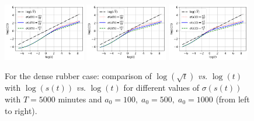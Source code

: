 \documentclass{article}
\begin{document}
\begin{figure}[h!]
	\centering
	\includegraphics[width=0.32\textwidth]{Rubber_Large_Loglog_a0_100.png}
	\hspace{0.1cm}
	\includegraphics[width=0.32\textwidth]{Rubber_Large_Loglog_a0_500.png}
	\hspace{0.1cm}
	\includegraphics[width=0.32\textwidth]{Rubber_Large_Loglog_a0_1000.png}
	\caption{For the dense rubber case: comparison of $\log(\sqrt{t})$ \textit{vs}. $\log(t)$ with  $\log(s(t))$ \textit{vs}. $\log(t)$ for different values of $\sigma(s(t))$ with $T = 5000$ minutes and $a_0 = 100, \;a_0 =  500, \;a_0 =  1000$ (from left to right).}
	\label{Fig:15}
\end{figure}
\end{document}
